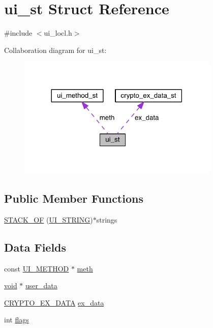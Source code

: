\hypertarget{structui__st}{}\section{ui\+\_\+st Struct Reference}
\label{structui__st}


{\ttfamily \#include $<$ui\+\_\+locl.\+h$>$}



Collaboration diagram for ui\+\_\+st\+:\nopagebreak
\begin{figure}[H]
\begin{center}
\leavevmode
\includegraphics[width=272pt]{structui__st__coll__graph}
\end{center}
\end{figure}
\subsection*{Public Member Functions}
\begin{DoxyCompactItemize}
\item 
\hyperlink{structui__st_a2094de652dff0047d72a4e84a34568df}{S\+T\+A\+C\+K\+\_\+\+OF} (\hyperlink{crypto_2ui_2ui_8h_ac00ec05cf702eb7ebfa365ae2ba7d7d2}{U\+I\+\_\+\+S\+T\+R\+I\+NG})$\ast$strings
\end{DoxyCompactItemize}
\subsection*{Data Fields}
\begin{DoxyCompactItemize}
\item 
const \hyperlink{crypto_2ossl__typ_8h_ae3aeb39de6da29bb42ea0ed3ce1560dc}{U\+I\+\_\+\+M\+E\+T\+H\+OD} $\ast$ \hyperlink{structui__st_aba26c1bbf57bd3c8fada4df18211ccee}{meth}
\item 
\hyperlink{hw__4758__cca_8h_afad4d591c7931ff6dc5bf69c76c96aa0}{void} $\ast$ \hyperlink{structui__st_a0f53d287ac7c064d1a49d4bd93ca1cb9}{user\+\_\+data}
\item 
\hyperlink{crypto_2ossl__typ_8h_a7eaff1c18057495d8af18f22d1370b51}{C\+R\+Y\+P\+T\+O\+\_\+\+E\+X\+\_\+\+D\+A\+TA} \hyperlink{structui__st_ac3e4fd59d6ee44a81f3a58114613c1e2}{ex\+\_\+data}
\item 
int \hyperlink{structui__st_ac8bf36fe0577cba66bccda3a6f7e80a4}{flags}
\end{DoxyCompactItemize}


